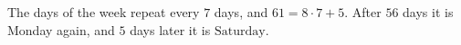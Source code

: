 The days of the week repeat every $7$ days, and $61=8\cdot7+5$. After $56$ days it is Monday again, and $5$ days later it is $\boxed{\text{Saturday}}$.
